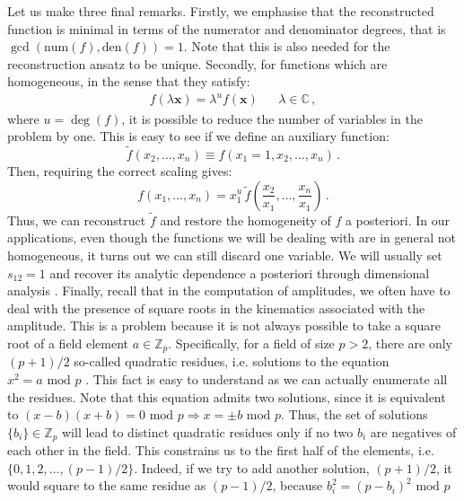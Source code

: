 \documentclass[main.tex]{subfiles}
\begin{document}
Let us make three final remarks. Firstly, we emphasise that the reconstructed function is minimal in terms of the numerator and denominator degrees, that is $\gcd \left(\text{num}(f), \text{den}(f) \right) = 1$. Note that this is also needed for the reconstruction ansatz to be unique. Secondly, for functions which are homogeneous, in the sense that they satisfy:
\begin{align}
    f(\lambda \mathbf{x}) = \lambda^u f(\mathbf{x}) && \lambda \in \mathbb{C} \,,
\end{align}
where $u=\deg (f)$, it is possible to reduce the number of variables in the problem by one. This is easy to see if we define an auxiliary function:
\begin{equation}
    \tilde{f}(x_2, \ldots, x_n) \equiv f(x_1=1, x_2, \ldots, x_n)\,.
\end{equation}
Then, requiring the correct scaling gives:
\begin{equation}
    f(x_1, \ldots, x_n) = x_1^u \, \tilde{f}\left(\frac{x_2}{x_1}, \ldots, \frac{x_n}{x_1}\right) \,.
\end{equation}
Thus, we can reconstruct $\tilde{f}$ and restore the homogeneity of $f$ a posteriori. In our applications, even though the functions we will be dealing with are in general not homogeneous, it turns out we can still discard one variable. We will usually set $s_{12} = 1$ and recover its analytic dependence a posteriori through dimensional analysis  . Finally, recall that in the computation of amplitudes, we often have to deal with the presence of square roots in the kinematics associated with the amplitude. This is a problem because it is not always possible to take a square root of a field element $a \in \mathbb{Z}_p$. Specifically, for a field of size $p>2$, there are only $(p+1)/2$ so-called quadratic residues, i.e. solutions to the equation $x^2=a \text{ mod } p$ \cite{hardy2008introduction}. This fact is easy to understand as we can actually enumerate all the residues. Note that this equation admits two solutions, since it is equivalent to $(x-b)(x+b)=0 \text{ mod } p \Longrightarrow x = \pm b \text{ mod } p$. Thus, the set of solutions $\{b_i\} \in \mathbb{Z}_p$ will lead to distinct quadratic residues only if no two $b_i$ are negatives of each other in the field. This constrains us to the first half of the elements, i.e. $\{0, 1, 2, \ldots, (p-1)/2 \}$. Indeed, if we try to add another solution, $(p+1)/2$, it would square to the same residue as $(p-1)/2$, because $b_i^2 = (p-b_i)^2 \text{ mod }p$
\end{document}
